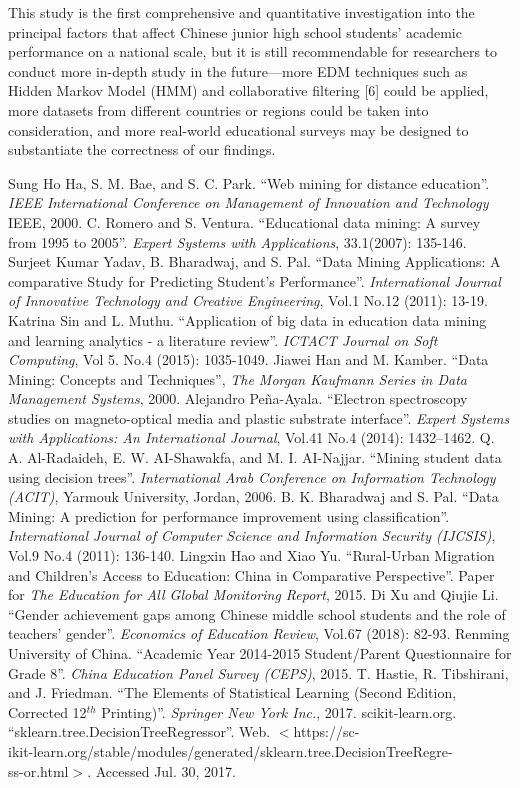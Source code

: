\documentclass[conference]{IEEEtran}
\begin{document}
This study is the first comprehensive and quantitative investigation into the principal factors that affect Chinese junior high school students' academic performance on a national scale, but it is still recommendable for researchers to conduct more in-depth study in the future—more EDM techniques such as Hidden Markov Model (HMM) and collaborative filtering [6] could be applied, more datasets from different countries or regions could be taken into consideration, and more real-world educational surveys may be designed to substantiate the correctness of our findings.
\begin{thebibliography}{00}
 Sung Ho Ha, S. M. Bae, and S. C. Park. ``Web mining for distance education''. \textit{IEEE International Conference on Management of Innovation and Technology} IEEE, 2000.
 C. Romero and S. Ventura. ``Educational data mining: A survey from 1995 to 2005''. \textit{Expert Systems with Applications}, 33.1(2007): 135-146.
 Surjeet Kumar Yadav, B. Bharadwaj, and S. Pal. ``Data Mining Applications: A comparative Study for Predicting Student's Performance''. \textit{International Journal of Innovative Technology and Creative Engineering}, Vol.1 No.12 (2011): 13-19.
 Katrina Sin and L. Muthu. ``Application of big data in education data mining and learning analytics - a literature review''. \textit{ICTACT Journal on Soft Computing}, Vol 5. No.4 (2015): 1035-1049.
 Jiawei Han and M. Kamber. ``Data Mining: Concepts and Techniques'', \textit{The Morgan Kaufmann Series in Data Management Systems}, 2000.
 Alejandro Peña-Ayala. ``Electron spectroscopy studies on magneto-optical media and plastic substrate interface''. \textit{Expert Systems with Applications: An International Journal}, Vol.41 No.4 (2014): 1432–1462. 
 Q. A. Al-Radaideh, E. W. AI-Shawakfa, and M. I. AI-Najjar. ``Mining student data using decision trees''. \textit{International Arab Conference on Information Technology (ACIT)}, Yarmouk University, Jordan, 2006. 
 B. K. Bharadwaj and S. Pal. ``Data Mining: A prediction for performance improvement using classification''. \textit{International Journal of Computer Science and Information Security (IJCSIS)}, Vol.9 No.4 (2011): 136-140. 
 Lingxin Hao and Xiao Yu. ``Rural-Urban Migration and Children's Access to Education: China in Comparative Perspective''. Paper for \textit{The Education for All Global Monitoring Report}, 2015.
 Di Xu and Qiujie Li. ``Gender achievement gaps among Chinese middle school students and the role of teachers’ gender''. \textit{Economics of Education Review}, Vol.67 (2018): 82-93.
 Renming University of China. ``Academic Year 2014-2015 Student/Parent Questionnaire for Grade 8''. \textit{China Education Panel Survey (CEPS)}, 2015.
 T. Hastie, R. Tibshirani, and J. Friedman. ``The Elements of Statistical Learning (Second Edition, Corrected 12$^{th}$ Printing)''. \textit{Springer New York Inc.}, 2017.
 scikit-learn.org. ``sklearn.tree.DecisionTreeRegressor''. Web. $<$https://sc-\\ikit-learn.org/stable/modules/generated/sklearn.tree.DecisionTreeRegre-\\ss-or.html$>$. Accessed Jul. 30, 2017.
\end{thebibliography}
\end{document}
